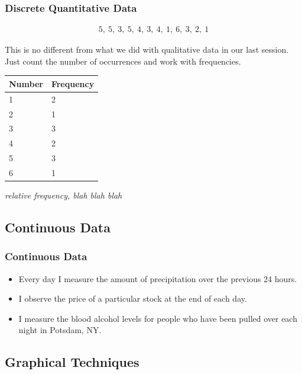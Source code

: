 \begin{frame}
  \frametitle{Discrete Quantitative Data}

  \begin{eqnarray*}
    5,~5,~3,~5,~4,~3,~4,~1,~6,~3,~2,~1
  \end{eqnarray*}

  This is no different from what we did with qualitative data in our
  last session. Just count the number of occurrences and work with
  frequencies.


  {
    \begin{tabular}{l|l}
      Number  & Frequency \\ \hline
      1 & 2 \\
      2 & 1 \\
      3 & 3 \\
      4 & 2 \\
      5 & 3 \\
      6 & 1 
    \end{tabular}
  }

  {
    \textit{relative frequency, blah blah blah}
  }

\end{frame}

\subsection{Continuous Data}

\begin{frame}
  \frametitle{Continuous Data}

  \begin{itemize}
  \item Every day I measure the amount of precipitation over the
    previous 24 hours.

  \item I observe the price of a particular stock at the end of each day.

  \item I measure the blood alcohol levels for people who have been
    pulled over each night in Potsdam, NY.
  \end{itemize}
\end{frame}

\subsection{Graphical Techniques}

